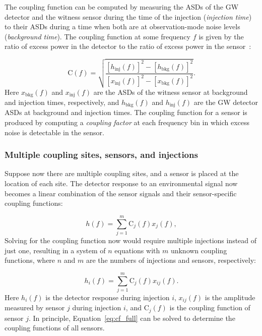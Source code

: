 The coupling function can be computed by measuring the \acp{ASD} of the \ac{GW} detector and the witness sensor during the time of the injection (\textit{injection time}) to their \acp{ASD} during a time when both are at observation-mode noise levels (\textit{background time}).
The coupling function at some frequency $f$ is given by the ratio of excess power in the detector to the ratio of excess power in the sensor~\cite{Kruk_2016, pem_code}:

\begin{equation}\label{eq:cf}
	\mathrm{C}(f) = \sqrt{\frac{[h_{\textrm{inj}}(f)]^2 - [h_{\textrm{bkg}}(f)]^2}{[x_{\textrm{inj}}(f)]^2 - [x_{\textrm{bkg}}(f)]^2}}.
\end{equation}
Here $x_{\textrm{bkg}}(f)$ and $x_{\textrm{inj}}(f)$ are the \acp{ASD} of the witness sensor at background and injection times, respectively, and $h_{\textrm{bkg}}(f)$ and $h_{\textrm{inj}}(f)$ are the \ac{GW} detector \acp{ASD} at background and injection times.
The coupling function for a sensor is produced by computing a \textit{coupling factor} at each frequency bin in which excess noise is detectable in the sensor.

\subsubsection{Multiple coupling sites, sensors, and injections}

Suppose now there are multiple coupling sites, and a sensor is placed at the location of each site.
The detector response to an environmental signal now becomes a linear combination of the sensor signals and their sensor-specific coupling functions:

\begin{equation}\label{eq:cf_model_expanded}
	h(f) = \sum_{j=1}^{m} \mathrm{C}_j(f) x_{j}(f),
\end{equation}
Solving for the coupling function now would require multiple injections instead of just one, resulting in a system of $n$ equations with $m$ unknown coupling functions, where $n$ and $m$ are the numbers of injections and sensors, respectively:

\begin{equation}\label{eq:cf_full}
	h_i(f) = \sum_{j=1}^{m} \mathrm{C}_j(f) x_{ij}(f).
\end{equation}
Here $h_i(f)$ is the detector response during injection $i$, $x_{ij}(f)$ is the amplitude measured by sensor $j$ during injection $i$, and $\mathrm{C}_j(f)$ is the coupling function of sensor $j$.
In principle, Equation~\ref{eq:cf_full} can be solved to determine the coupling functions of all sensors.

